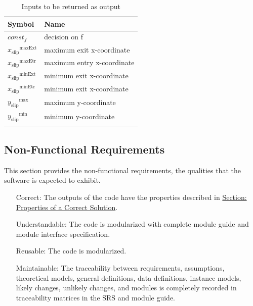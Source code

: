 \documentclass[12pt]{article}
\begin{document}
\begin{longtable}{l l}
\toprule
\textbf{Symbol} & \textbf{Name}
\\
\midrule
\endhead
$const_f$ & decision on f
\\
${{x_{\text{slip}}}^{\text{maxExt}}}$ & maximum exit x-coordinate
\\
${{x_{\text{slip}}}^{\text{maxEtr}}}$ & maximum entry x-coordinate
\\
${{x_{\text{slip}}}^{\text{minExt}}}$ & minimum exit x-coordinate
\\
${{x_{\text{slip}}}^{\text{minEtr}}}$ & minimum exit x-coordinate
\\
${{y_{\text{slip}}}^{\text{max}}}$ & maximum y-coordinate
\\
${{y_{\text{slip}}}^{\text{min}}}$ & minimum y-coordinate
\\
\bottomrule
\caption{Inputs to be returned as output}
\label{Table:inputsToOutputTable}
\end{longtable}
\subsection{Non-Functional Requirements}
\label{Sec:NFRs}
This section provides the non-functional requirements, the qualities that the software is expected to exhibit.
\begin{itemize}
\item[Correct:\phantomsection\label{correct}]The outputs of the code have the properties described in \hyperref[Sec:CorSolProps]{Section: Properties of a Correct Solution}.
\item[Understandable:\phantomsection\label{understandable}]The code is modularized with complete module guide and module interface specification.
\item[Reusable:\phantomsection\label{reusable}]The code is modularized.
\item[Maintainable:\phantomsection\label{maintainable}]The traceability between requirements, assumptions, theoretical models, general definitions, data definitions, instance models, likely changes, unlikely changes, and modules is completely recorded in traceability matrices in the SRS and module guide.
\end{itemize}
\end{document}

